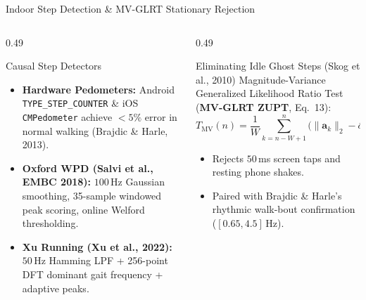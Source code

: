 \documentclass[aspectratio=169,10pt]{beamer}
\begin{document}
\begin{frame}{Indoor Step Detection \& MV-GLRT Stationary Rejection}
  \begin{columns}[T]
    \begin{column}{0.49\textwidth}
      \begin{block}{Causal Step Detectors}
        \begin{itemize}\small
          \item \textbf{Hardware Pedometers:} Android \texttt{TYPE\_STEP\_COUNTER} \& iOS \texttt{CMPedometer} achieve $<5\%$ error in normal walking (Brajdic \& Harle, 2013).
          \item \textbf{Oxford WPD (Salvi et al., EMBC 2018):} $100$\,Hz Gaussian smoothing, 35-sample windowed peak scoring, online Welford thresholding.
          \item \textbf{Xu Running (Xu et al., 2022):} $50$\,Hz Hamming LPF + 256-point DFT dominant gait frequency + adaptive peaks.
        \end{itemize}
      \end{block}
    \end{column}
    \begin{column}{0.49\textwidth}
      \begin{alertblock}{Eliminating Idle Ghost Steps (Skog et al., 2010)}
        \small Magnitude-Variance Generalized Likelihood Ratio Test (\textbf{MV-GLRT ZUPT}, Eq.~13):
        \[
          T_{\text{MV}}(n) = \frac{1}{W}\sum_{k=n-W+1}^{n}\bigl(\|\mathbf{a}_k\|_2 - \bar{a}_n\bigr)^2 < \gamma_{\text{MV}}
        \]
        \begin{itemize}\small
          \item Rejects $50$\,ms screen taps and resting phone shakes.
          \item Paired with Brajdic \& Harle's rhythmic walk-bout confirmation ($[0.65, 4.5]$\,Hz).
        \end{itemize}
      \end{alertblock}
    \end{column}
  \end{columns}
\end{frame}
\end{document}
